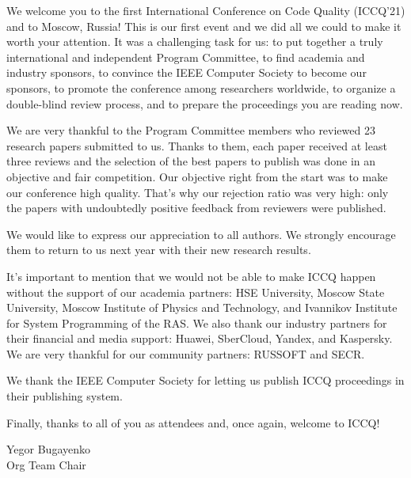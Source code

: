 
\clearpage
{}

We welcome you to the first International Conference on Code Quality (ICCQ'21)
and to Moscow, Russia! This is our first event and we did all we could to make
it worth your attention. It was a challenging task for us:
to put together a truly international and independent Program Committee,
to find academia and industry sponsors,
to convince the IEEE Computer Society to become our sponsors,
to promote the conference among researchers worldwide,
to organize a double-blind review process,
and to prepare the proceedings you are reading now.

We are very thankful to the Program Committee members who
reviewed 23 research papers submitted to us. Thanks to them,
each paper received at least three reviews and the selection of the best papers to publish
was done in an objective and fair competition. Our objective right
from the start was to make our conference high quality.
That's why our rejection ratio was very high: only the
papers with undoubtedly positive feedback from reviewers were published.

We would like to express our appreciation to all authors.
We strongly encourage them to return to us next year
with their new research results.

It's important to mention that we would not be able to make
ICCQ happen without the support of our academia partners:
HSE University,
Moscow State University,
Moscow Institute of Physics and Technology,
and Ivannikov Institute for System Programming of the RAS.
We also thank our industry partners for their financial and media support:
Huawei, SberCloud, Yandex, and Kaspersky.
We are very thankful for our community partners: RUSSOFT and SECR.

We thank the IEEE Computer Society for letting us publish ICCQ proceedings
in their publishing system.

Finally, thanks to all of you as attendees and, once again, welcome to ICCQ!

Yegor Bugayenko\\
Org Team Chair
